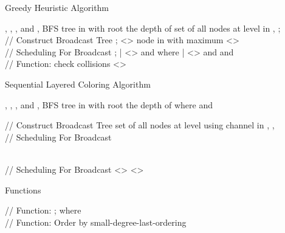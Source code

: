\documentclass[10pt, conference]{IEEEtran}
\begin{document}
\begin{algorithm}[htb]
\caption{Greedy Heuristic Algorithm}
\label{A1-1}
\begin{algorithmic}[1]
\REQUIRE , , , and 
\ENSURE , 
\STATE  BFS tree in  with root 
\STATE  the depth of 
\STATE  set of all nodes at level  in
, 
    \STATE ; 
\ENDFOR\\
// Construct Broadcast Tree
\STATE 
{}
    \STATE ; 
    \WHILE {}
\STATE <> node  in  with maximum 
\STATE 
        \STATE   
\STATE  <>
        \STATE 
    \ENDWHILE
\ENDFOR \\
// Scheduling For Broadcast
\STATE ; 
\STATE 
\WHILE {}
    \STATE 
\STATE    | <>  and 
    \WHILE {}
\STATE 
        \STATE 
\STATE  where 
\STATE   | <>  and  and 
    \ENDWHILE
\ENDWHILE \\
// Function: check collisions
\STATE <>
        \STATE 
    \ELSE
        \STATE 
    \ENDIF
\ENDFOR \\
\end{algorithmic}
\end{algorithm}

\begin{algorithm}[htb]
\caption{Sequential Layered Coloring Algorithm}
\label{A2-1}
\begin{algorithmic}[1]
\REQUIRE , , , and 
\ENSURE , 
\STATE  BFS tree in  with root 
\STATE  the depth of 
\STATE  where  and 

// Construct Broadcast Tree
\STATE  set of all nodes at level  using channel  in , , 
        \STATE 
            \IF {()}
                \STATE 
            \ENDIF
        \ENDFOR
\STATE 
    \ENDFOR
\ENDFOR\\
// Scheduling For Broadcast
\STATE 
{}
        \STATE 
            \STATE 
            \STATE 
        \ENDFOR


        \STATE 
        \STATE 
            \STATE 
            \STATE 
        \ENDFOR
    \ENDFOR
\ENDFOR\\
// Scheduling For Broadcast
        \STATE 
            \STATE <>
        \ENDFOR
        \STATE 
    \ENDFOR
    \STATE 
        \IF {}
            \STATE 
        \ENDIF
            \STATE <>
        \ENDFOR
    \ENDFOR
    \STATE 
\ENDFOR
\end{algorithmic}
\end{algorithm}

\begin{algorithm}[htb]
\caption{Functions}
\begin{algorithmic}[1]
\STATE // Function: 
\STATE ; 
\STATE  where 
\WHILE{ }
    \STATE 
\ENDWHILE
\STATE  \\
// Function: 
\STATE 
\STATE Order  by small-degree-last-ordering
\end{algorithmic}
\end{algorithm}
\fi
\end{document}
